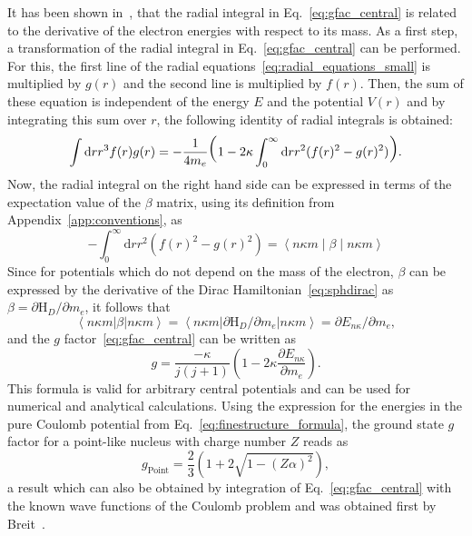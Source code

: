 It has been shown in~\cite{Karshenboim2005}, that the radial integral in Eq.~\eqref{eq:gfac_central} is related to the derivative of the electron energies with respect to its mass. As a first step, a transformation of the radial integral in Eq.~\eqref{eq:gfac_central} can be performed. For this, the first line of the radial equations~\eqref{eq:radial_equations_small} is multiplied by $g(r)$ and the second line is multiplied by $f(r)$. Then, the sum of these equation is independent of the energy $E$ and the potential $V(r)$ and by integrating this sum over $r$, the following identity of radial integrals is obtained:
\begin{equation}
\int\mathrm{d}r r^3 f(r)g(r) = -\frac{1}{4m_e}
\text{\huge(}1-2\kappa \int_0^\infty\mathrm{d}r r^2 (f(r)^2-g(r)^2)\text{\huge)}.
\end{equation}
Now, the radial integral on the right hand side can be expressed in terms of the expectation value of the $\beta$ matrix, using its definition from Appendix~\ref{app:conventions}, as
\begin{equation}
-\int_0^\infty\mathrm{d}r r^2 (f(r)^2-g(r)^2)=\left<n\kappa m\middle|\beta\middle|n\kappa m\right>
\end{equation}
Since for potentials which do not depend on the mass of the electron, $\beta$ can be expressed by the derivative of the Dirac Hamiltonian~\eqref{eq:sphdirac} as $\beta = \partial\text{H}_D/\partial m_e$, it follows that
\begin{equation}
\left<n\kappa m\right|\beta\left|n\kappa m\right> = \left<n\kappa m\right|\partial\text{H}_D/\partial m_e\left|n\kappa m\right> = \partial E_{n\kappa}/\partial m_e,
\end{equation}
and the $g$ factor~\eqref{eq:gfac_central} can be written as
\begin{equation}
g = \frac{-\kappa}{j(j+1)}\left( 1-2\kappa\frac{\partial E_{n\kappa}}{\partial m_e}\right).
\label{eq:gfac_viaDeriv}
\end{equation}
This formula is valid for arbitrary central potentials and can be used for numerical and analytical calculations. Using the expression for the energies in the pure Coulomb potential from Eq.~\eqref{eq:finestructure_formula}, the ground state $g$ factor for a point-like nucleus with charge number $Z$ reads as
\begin{equation}
\label{eq:point_gfac}
g_{\text{Point}}=\frac{2}{3}\left( 1+2\sqrt{1-(Z\alpha)^2}\right),
\end{equation}
a result which can also be obtained by integration of Eq.~\eqref{eq:gfac_central} with the known wave functions of the Coulomb problem and was obtained first by Breit~\cite{breit1928}.

